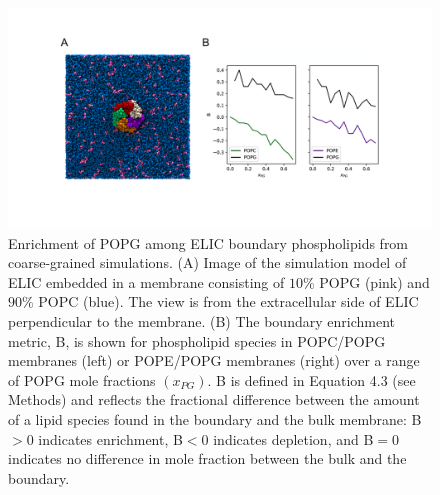 \begin{figure}
\center
\includegraphics[width=\linewidth]{./pandoc_test/media/image2.pdf}
	\begin{flushleft}

\caption[Enrichment of POPG among ELIC boundary phospholipids from coarse-grained simulations.] {Enrichment of POPG among ELIC boundary phospholipids from coarse-grained simulations. (A) Image of the simulation model of ELIC embedded in a membrane consisting of $10\%$ POPG (pink) and $90\%$ POPC (blue). The view is from the extracellular side of ELIC perpendicular to the membrane. (B) The boundary enrichment metric, B, is shown for phospholipid species in POPC/POPG membranes (left) or POPE/POPG membranes (right) over a range of POPG mole fractions $(x_{PG})$. B is defined in Equation 4.3 (see Methods) and reflects the fractional difference between the amount of a lipid species found in the boundary and the bulk membrane: B$>$0 indicates enrichment, B$<$0 indicates depletion, and B$=$0 indicates no difference in mole fraction between the bulk and the boundary.}  \label{fig:two}
	\end{flushleft}

\end{figure}

